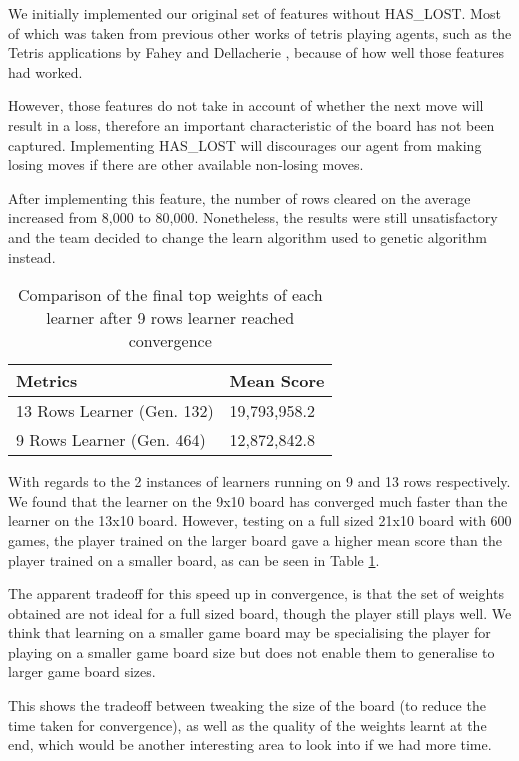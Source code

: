\documentclass[a4paper,12pt,twocolumn]{article}
\begin{document}
We initially implemented our original set of features without HAS\_LOST. Most of which
was taken from previous other works of tetris playing agents, such as the Tetris
applications by Fahey and Dellacherie \cite{colin_fahey}, because of
how well those features had worked.

However, those features do not take in account of whether the next move will result
in a loss, therefore an important characteristic of the board has not been captured.
Implementing HAS\_LOST will discourages our agent from making losing moves if
there are other available non-losing moves.

After implementing this feature, the number of rows cleared on the average increased
from 8,000 to 80,000. Nonetheless, the results were still unsatisfactory and the team
decided to change the learn algorithm used to genetic algorithm instead.

\begin{table}[H]
	\centering
	\begin{tabular}{|l|l|}
		\hline
		\textbf{Metrics}                 & \textbf{Mean Score} \\
		\hline
		13 Rows Learner (Gen. 132) & 19,793,958.2        \\
		\hline
		9 Rows Learner (Gen. 464)  & 12,872,842.8        \\
		\hline
	\end{tabular}
	\caption{
		Comparison of the final top weights of each learner after 9 rows learner
		reached convergence
	}
	\label{learner_comparison}
\end{table}

With regards to the 2 instances of learners running on 9 and 13 rows respectively.
We found that the learner on the 9x10 board has converged much faster than the
learner on the 13x10 board. However, testing on a full sized 21x10 board with 600 games,
the player trained on the larger board gave a higher mean score than the player
trained on a smaller board, as can be seen in Table \ref{learner_comparison}.

The apparent tradeoff for this speed up in convergence, is that the set of weights
obtained are not ideal for a full sized board, though the player still plays well.
We think that learning on a smaller game board may be specialising the player for playing on
a smaller game board size but does not enable them to generalise to larger game board sizes.

This shows the tradeoff between tweaking the size of the board (to
reduce the time taken for convergence), as well as the quality of the weights
learnt at the end, which would be another interesting area to look into if we had
more time.
\end{document}
